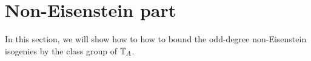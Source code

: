 \documentclass[thesis.tex]{subfiles}
\begin{document}



\section{Non-Eisenstein part}%
\label{sec:non_eisenstein_part}

In this section, we will show how to how to bound the odd-degree non-Eisenstein
isogenies by the class group of $\mathbb{T}_A$.
\end{document}
